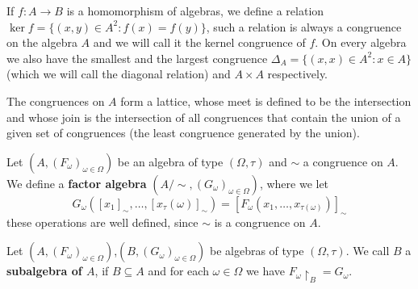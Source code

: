     If $f: A \to B$ is a homomorphism of algebras, we define a relation $\ker{f} = \{(x,y)\in A^2 : f(x)=f(y)\}$, such a relation is
    always a congruence on the algebra $A$ and we will call it the kernel congruence of $f$. On every algebra we also have the 
    smallest and the largest congruence $\Delta_A = \{(x,x)\in A^2 : x\in A\}$ (which we will call the diagonal relation) and $A\times A$ respectively. \par 
    The congruences on $A$ form a lattice, whose meet is defined to be the intersection and whose join is the intersection of all congruences 
    that contain the union of a given set of congruences (the least congruence generated by the union).
\begin{definition}
    Let $(A,(F_\omega)_{\omega\in\Omega})$ be an algebra of type $(\Omega,\tau)$ and $\sim$ a congruence on $A$. We define a 
    \textbf{factor algebra} $(A/\sim,(G_\omega)_{\omega\in\Omega})$, where we let
    \[
        G_\omega([x_1]_\sim,\dots,[x_\tau(\omega)]_\sim) = [F_\omega(x_1,\dots,x_{\tau(\omega)})]_\sim
    \] 
    these operations are well defined, since $\sim$ is a congruence on $A$.
\end{definition}
\begin{definition}
    Let $(A,(F_\omega)_{\omega\in\Omega})$,$(B,(G_\omega)_{\omega\in\Omega})$ be algebras of type $(\Omega,\tau)$. We call $B$ a \textbf{subalgebra 
    of $A$}, if $B\subseteq A$ and for each $\omega\in\Omega$ we have $F_\omega\restriction_B = G_\omega$.
\end{definition}
\fi